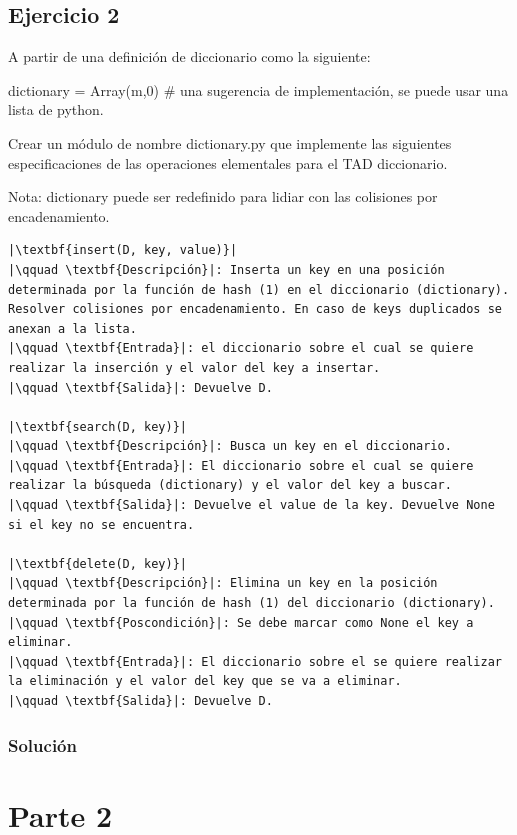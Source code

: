 \documentclass{article}
\begin{document}
\subsection*{Ejercicio 2}
A partir de una definición de diccionario como la siguiente:

dictionary = Array(m,0) \# una sugerencia de implementación, se puede usar una lista de python.

Crear un módulo de nombre dictionary.py que implemente las siguientes especificaciones de las operaciones elementales para el TAD diccionario.

Nota: dictionary puede ser redefinido para lidiar con las colisiones por encadenamiento.

\begin{lstlisting}
|\textbf{insert(D, key, value)}|
|\qquad \textbf{Descripción}|: Inserta un key en una posición determinada por la función de hash (1) en el diccionario (dictionary). Resolver colisiones por encadenamiento. En caso de keys duplicados se anexan a la lista.
|\qquad \textbf{Entrada}|: el diccionario sobre el cual se quiere realizar la inserción y el valor del key a insertar.        
|\qquad \textbf{Salida}|: Devuelve D.

|\textbf{search(D, key)}|
|\qquad \textbf{Descripción}|: Busca un key en el diccionario.
|\qquad \textbf{Entrada}|: El diccionario sobre el cual se quiere realizar la búsqueda (dictionary) y el valor del key a buscar.
|\qquad \textbf{Salida}|: Devuelve el value de la key. Devuelve None si el key no se encuentra.        

|\textbf{delete(D, key)}|
|\qquad \textbf{Descripción}|: Elimina un key en la posición determinada por la función de hash (1) del diccionario (dictionary).
|\qquad \textbf{Poscondición}|: Se debe marcar como None el key a eliminar.
|\qquad \textbf{Entrada}|: El diccionario sobre el se quiere realizar la eliminación y el valor del key que se va a eliminar.
|\qquad \textbf{Salida}|: Devuelve D.
\end{lstlisting}
\subsubsection*{Solución}


\section*{Parte 2}
\end{document}
